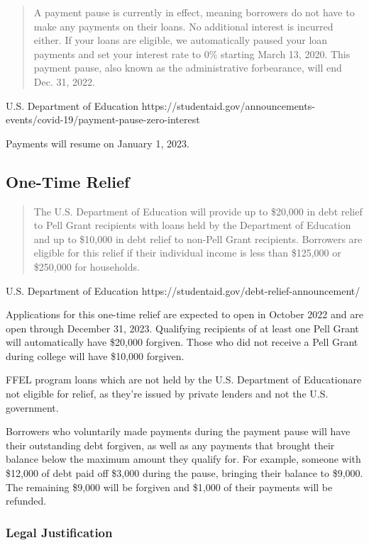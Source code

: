 \documentclass{../khw}
\newcommand{\ed}{Department of Education}
\newcommand{\used}{U.S. \ed}
\begin{document}
\blockquote{
    A payment pause is currently in effect, meaning borrowers do not have to make
    any payments on their loans. No additional interest is incurred either. If your
    loans are eligible, we automatically paused your loan payments and set your
    interest rate to 0\% starting March 13, 2020. This payment pause, also known as
    the administrative forbearance, will end Dec. 31, 2022.
}{\used}%
{https://studentaid.gov/announcements-events/covid-19/payment-pause-zero-interest}

Payments will resume on January 1, 2023.

\subsection{One-Time Relief}

\blockquote{
    The U.S. Department of Education will provide up to \$20,000 in debt relief to
    Pell Grant recipients with loans held by the Department of Education and up to
    \$10,000 in debt relief to non-Pell Grant recipients. Borrowers are eligible for
    this relief if their individual income is less than \$125,000 or \$250,000 for
    households.
}{\used}%
{https://studentaid.gov/debt-relief-announcement/}

Applications for this one-time relief are expected to open in October 2022 and
are open through December 31, 2023. Qualifying recipients of at least one Pell
Grant will automatically have \$20,000 forgiven. Those who did not receive a
Pell Grant during college will have \$10,000 forgiven.

FFEL program loans which are not held by the \used are not eligible for relief,
as they're issued by private lenders and not the U.S. government.

Borrowers who voluntarily made payments during the payment pause will have their
outstanding debt forgiven, as well as any payments that brought their balance
below the maximum amount they qualify for. For example, someone with \$12,000 of
debt paid off \$3,000 during the pause, bringing their balance to \$9,000. The
remaining \$9,000 will be forgiven and \$1,000 of their payments will be
refunded.

\subsubsection{Legal Justification}

\end{document}
